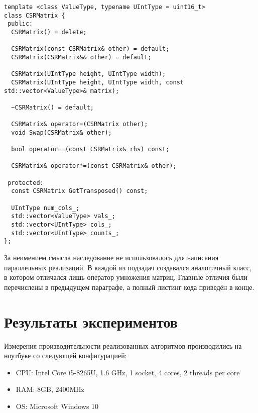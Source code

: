 \documentclass{report}
\begin{document}
\begin{lstlisting}
template <class ValueType, typename UIntType = uint16_t>
class CSRMatrix {
 public:
  CSRMatrix() = delete;

  CSRMatrix(const CSRMatrix& other) = default;
  CSRMatrix(CSRMatrix&& other) = default;

  CSRMatrix(UIntType height, UIntType width);
  CSRMatrix(UIntType height, UIntType width, const std::vector<ValueType>& matrix);
  
  ~CSRMatrix() = default;
  
  CSRMatrix& operator=(CSRMatrix other);
  void Swap(CSRMatrix& other);

  bool operator==(const CSRMatrix& rhs) const;

  CSRMatrix& operator*=(const CSRMatrix& other);

 protected:
  const CSRMatrix GetTransposed() const;

  UIntType num_cols_;
  std::vector<ValueType> vals_;
  std::vector<UIntType> cols_;
  std::vector<UIntType> counts_;
};
\end{lstlisting}

За неимением смысла наследование не использовалось для написания параллельных реализаций. В каждой из подзадач создавался аналогичный класс, в котором отличался лишь оператор умножения матриц. Главные отличия были перечислены в предыдущем параграфе, а полный листинг кода приведён в конце.


\newpage
\section*{Результаты экспериментов}
Измерения производительности реализованных алгоритмов производились на ноутбуке со следующей конфигурацией:

\begin{itemize}
\item CPU: Intel\textsuperscript{\textregistered} Core\textsuperscript{\texttrademark} i5-8265U, 1.6 GHz, 1 socket, 4 cores, 2 threads per core
\item RAM: 8GB, 2400MHz
\item OS: Microsoft Windows 10
\end{itemize}

\end{document}
